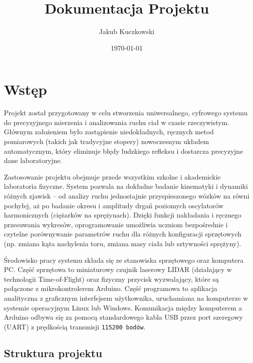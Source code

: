 \documentclass[a4paper,12pt]{article}
\title{Dokumentacja Projektu}
\author{Jakub Kuczkowski}
\date{\today}
\begin{document}
\maketitle

\tableofcontents
\newpage


\section{Wstęp}

\noindent Projekt został przygotowany w celu stworzenia uniwersalnego, cyfrowego systemu do precyzyjnego mierzenia i analizowania ruchu ciał w czasie rzeczywistym. Głównym założeniem było zastąpienie niedokładnych, ręcznych metod pomiarowych (takich jak tradycyjne stopery) nowoczesnym układem automatycznym, który eliminuje błędy ludzkiego refleksu i dostarcza precyzyjne dane laboratoryjne.

\vspace{0.3cm}
\noindent Zastosowanie projektu obejmuje przede wszystkim szkolne i akademickie laboratoria fizyczne. System pozwala na dokładne badanie kinematyki i dynamiki różnych zjawisk – od analizy ruchu jednostajnie przyspieszonego wózków na równi pochyłej, aż po badanie okresu i amplitudy drgań poziomych oscylatorów harmonicznych (ciężarków na sprężynach). Dzięki funkcji nakładania i ręcznego przesuwania wykresów, oprogramowanie umożliwia uczniom bezpośrednie i czytelne porównywanie parametrów ruchu dla różnych konfiguracji sprzętowych (np. zmiana kąta nachylenia toru, zmiana masy ciała lub sztywności sprężyny).

\vspace{0.3cm}
\noindent Środowisko pracy systemu składa się ze stanowiska sprzętowego oraz komputera PC. Część sprzętowa to miniaturowy czujnik laserowy LIDAR (działający w technologii Time-of-Flight) oraz fizyczny przycisk wyzwalający, które są połączone z mikrokontrolerem Arduino. Część programowa to aplikacja analityczna z graficznym interfejsem użytkownika, uruchamiana na komputerze w systemie operacyjnym Linux lub Windows. Komunikacja między komputerem a Arduino odbywa się za pomocą standardowego kabla USB przez port szeregowy (UART) z prędkością transmisji \texttt{115200 bodów}.

\newpage
\subsection*{Struktura projektu}
\end{document}

